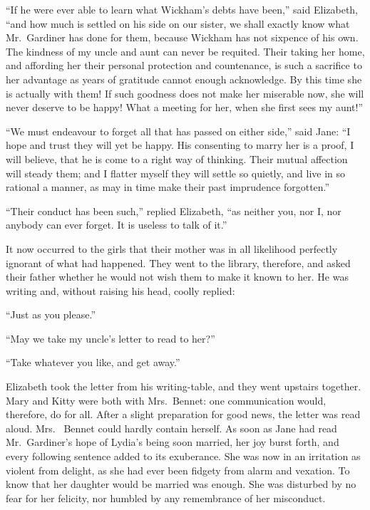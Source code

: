 ``If he were ever able to learn what Wickham's debts have been,''
said Elizabeth, ``and how much is settled on his side on our
sister, we shall exactly know what Mr.\ Gardiner has done for
them, because Wickham has not sixpence of his own.  The
kindness of my uncle and aunt can never be requited.  Their
taking her home, and affording her their personal protection
and countenance, is such a sacrifice to her advantage as years
of gratitude cannot enough acknowledge.  By this time she
is actually with them!  If such goodness does not make her
miserable now, she will never deserve to be happy!  What a
meeting for her, when she first sees my aunt!''

``We must endeavour to forget all that has passed on either side,''
said Jane: ``I hope and trust they will yet be happy.  His
consenting to marry her is a proof, I will believe, that he is
come to a right way of thinking.  Their mutual affection will
steady them; and I flatter myself they will settle so quietly,
and live in so rational a manner, as may in time make their
past imprudence forgotten.''

``Their conduct has been such,'' replied Elizabeth, ``as neither
you, nor I, nor anybody can ever forget.  It is useless to talk
of it.''

It now occurred to the girls that their mother was in all
likelihood perfectly ignorant of what had happened.  They went
to the library, therefore, and asked their father whether he
would not wish them to make it known to her.  He was writing
and, without raising his head, coolly replied:

``Just as you please.''

``May we take my uncle's letter to read to her?''

``Take whatever you like, and get away.''

Elizabeth took the letter from his writing-table, and they went
upstairs together.  Mary and Kitty were both with Mrs.\ Bennet:
one communication would, therefore, do for all.  After a slight
preparation for good news, the letter was read aloud.  Mrs.\ %
Bennet could hardly contain herself.  As soon as Jane had read
Mr.\ Gardiner's hope of Lydia's  being soon married, her joy
burst forth, and every following sentence added to its
exuberance.  She was now in an irritation as violent from
delight, as she had ever been fidgety from alarm and vexation.
To know that her daughter would be married was enough.  She
was disturbed by no fear for her felicity, nor humbled by any
remembrance of her misconduct.

